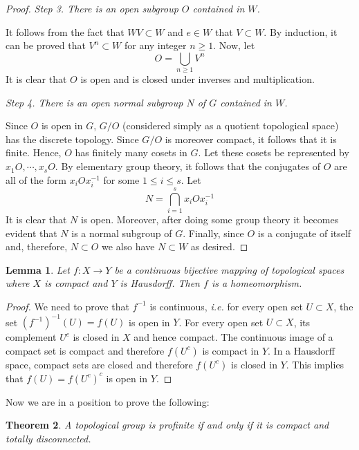 \documentclass[12pt]{article}
\newtheorem{thm}{Theorem}[section]
\newtheorem{lem}[thm]{Lemma}
\theoremstyle{definition}
\theoremstyle{remark}
\begin{document}
\begin{proof}
        \noindent\emph{Step 3. There is an open subgroup $O$ contained in $W$.}

        It follows from the fact that $WV \subset W$ and $e \in W$ that $V \subset W$. By induction, it can be proved that $V^n \subset W$ for any integer $n \geq 1$. Now, let
        $$ O = \bigcup_{n\geq 1} V^n $$
        It is clear that $O$ is open and is closed under inverses and multiplication.

        \noindent\emph{Step 4. There is an open normal subgroup $N$ of $G$ contained in $W$.}
        
        Since $O$ is open in $G$, $G/O$ (considered simply as a quotient topological space) has the discrete topology. Since $G/O$ is moreover compact, it follows that it is finite. Hence, $O$ has finitely many cosets in $G$. Let these cosets be represented by $x_1O,\cdots,x_sO$. By elementary group theory, it follows that the conjugates of $O$ are all of the form $x_iOx_i^{-1}$ for some $1\leq i\leq s$. Let
        $$ N = \bigcap_{i=1}^s x_iOx_i^{-1} $$
        It is clear that $N$ is open. Moreover, after doing some group theory it becomes evident that $N$ is a normal subgroup of $G$. Finally, since $O$ is a conjugate of itself and, therefore, $N\subset O$ we also have $N\subset W$ as desired.
    \end{proof}

    \begin{lem}\label{lem:chb}
        Let $f\colon X\to Y$ be a continuous bijective mapping of topological spaces where $X$ is compact and $Y$ is Hausdorff. Then $f$ is a homeomorphism.
    \end{lem}

    \begin{proof}
        We need to prove that $f^{-1}$ is continuous, \emph{i.e.} for every open set $U\subset X$, the set $(f^{-1})^{-1}(U)=f(U)$ is open in $Y$. For every open set $U\subset X$, its complement $U^c$ is closed in $X$ and hence compact. The continuous image of a compact set is compact and therefore $f(U^c)$ is compact in $Y$. In a Hausdorff space, compact sets are closed and therefore $f(U^c)$ is closed in $Y$. This implies that $f(U)=f(U^c)^c$ is open in $Y$.
    \end{proof}

    Now we are in a position to prove the following:

    \begin{thm}
        A topological group is profinite if and only if it is compact and totally disconnected.        
    \end{thm}
\end{document}
